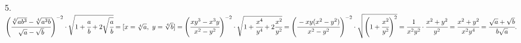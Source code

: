 5. $\left(\cfrac{\sqrt[4]{ab^3}-\sqrt[4]{a^3b}}{\sqrt{a}-\sqrt{b}}\right)^{-2}\cdot\sqrt{1+\cfrac{a}{b}+2\sqrt{\cfrac{a}{b}}}=[x=\sqrt[4]{a},\ y=\sqrt[4]{b}]=
\left(\cfrac{xy^3-x^3y}{x^2-y^2}\right)^{-2}\cdot\sqrt{1+\cfrac{x^4}{y^4}+2\cfrac{x^2}{y^2}}=
\left(\cfrac{-xy(x^2-y^2)}{x^2-y^2}\right)^{-2}\cdot\sqrt{\left(1+\cfrac{x^2}{y^2}\right)^2}=
\cfrac{1}{x^2y^2}\cdot\cfrac{x^2+y^2}{y^2}=\cfrac{x^2+y^2}{x^2y^4}=\cfrac{\sqrt{a}+\sqrt{b}}{b\sqrt{a}}.$\\
